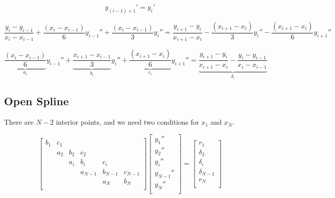 \documentclass[aps,onecolumn,11pt]{revtex4}
\begin{document}
$$
	y_{(i-1)+1}' = y_i'
$$
	
\begin{equation}
		\dfrac{y_{i}-y_{i-1}}{x_{i}-x_{i-1}} + \dfrac{(x_{i} - x_{i-1})}{6} y_{i-1}'' + \dfrac{(x_{i} - x_{i-1})}{3} y_{i}''
		=
		\dfrac{y_{i+1}-y_{i}}{x_{i+1}-x_{i}} - \dfrac{(x_{i+1} - x_i)}{3} y_i'' - \dfrac{(x_{i+1} - x_i)}{6} y_{i+1}''
\end{equation}
	
\begin{equation}
  \underbrace{\dfrac{(x_{i} - x_{i-1})}{6}}_{a_i} y_{i-1}''
+ \underbrace{\dfrac{x_{i+1}-x_{i-1}}{3}}_{b_i} y_i''
+ \underbrace{\dfrac{(x_{i+1} - x_i)}{6}}_{c_i} y_{i+1}'' = 
\underbrace{\dfrac{y_{i+1}-y_{i}}{x_{i+1}-x_{i}} - \dfrac{y_{i}-y_{i-1}}{x_{i}-x_{i-1}}}_{\delta_i}
\end{equation}	
	
\subsection{Open Spline}
There are $N-2$ interior points, and we need two conditions for $x_1$ and $x_N$.

\begin{equation}
\begin{bmatrix}
b_1  & c_1 &     &         &         &         \\
     & a_2 & b_2 & c_2     &         &         \\
     &     & a_i & b_i     & c_i     &         \\
     &     &     & a_{N-1} & b_{N-1} & c_{N-1} \\
     &     &     &         &   a_N   & b_N     \\
\end{bmatrix}
\begin{bmatrix}
	y_1''\\
	y_2''\\
	y_i''\\
	y_{N-1}''\\
	y_N''\\
\end{bmatrix}
 = 
 \begin{bmatrix}
 	r_1\\
	\delta_2\\
	\delta_i\\
	\delta_{N-1}\\
	r_N\\
 \end{bmatrix}
\end{equation}
\end{document}
